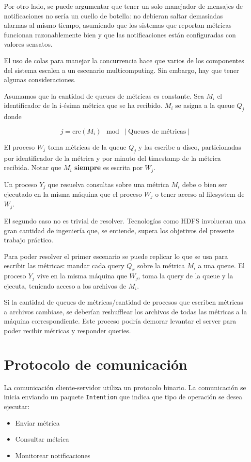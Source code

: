 \documentclass[titlepage,a4paper,oneside]{article}
\begin{document}
Por otro lado, se puede argumentar que tener un solo manejador de mensajes de notificaciones no sería un cuello de botella: no debieran saltar demasiadas alarmas al mismo tiempo, asumiendo que los sistemas que reportan métricas funcionan razonablemente bien y que las notificaciones están configuradas con valores sensatos.

El uso de colas para manejar la concurrencia hace que varios de los componentes del sistema escalen a un escenario multicomputing. Sin embargo, hay que tener algunas consideraciones.

Asumamos que la cantidad de queues de métricas es constante. Sea $M_i$ el identificador de la i-ésima métrica que se ha recibido. $M_i$ se asigna a la queue $Q_j$ donde

\begin{equation}\label{crcindex}
	j = \text{crc}(M_i) \mod \mid \text{Queues de métricas} \mid
\end{equation}

El proceso $W_j$ toma métricas de la queue $Q_j$ y las escribe a disco, particionadas por identificador de la métrica y por minuto del timestamp de la métrica recibida. Notar que $M_i$ \textbf{siempre} es escrita por $W_j$.

Un proceso $Y_j$ que resuelva consultas sobre una métrica $M_i$ debe o bien ser ejecutado en la misma máquina que el proceso $W_j$ o tener acceso al filesystem de $W_j$.

El segundo caso no es trivial de resolver. Tecnologías como HDFS\cite{HDFS} involucran una gran cantidad de ingeniería que, se entiende, supera los objetivos del presente trabajo práctico.

Para poder resolver el primer escenario se puede replicar lo que se usa para escribir las métricas: mandar cada query $Q_x$ sobre la métrica $M_i$ a una queue. El proceso $Y_j$ vive en la misma máquina que $W_j$, toma la query de la queue y la ejecuta, teniendo acceso a los archivos de $M_i$.

Si la cantidad de queues de métricas/cantidad de procesos que escriben métricas a archivos cambiase, se deberían reshufflear los archivos de todas las métricas a la máquina correspondiente. Este proceso podría demorar levantar el server para poder recibir métricas y responder queries.

\section{Protocolo de comunicación}
La comunicación cliente-servidor utiliza un protocolo binario. La comunicación se inicia enviando un paquete \texttt{Intention}\cite{IntentionPackage} que indica que tipo de operación se desea ejecutar:
\begin{itemize}
	\item Enviar métrica
	\item Consultar métrica
	\item Monitorear notificaciones
\end{itemize}
\end{document}
